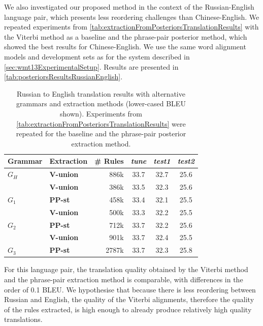 We also investigated our proposed method in the context of the Russian-English
language pair, which presents less reordering challenges than Chinese-English.
We repeated experiments from \autoref{tab:extractionFromPosteriorsTranslationResults}
with the Viterbi method as a baseline and the phrase-pair posterior method, which showed
the best results for Chinese-English. We use the same word alignment models and
development sets as for the system described in \autoref{sec:wmt13ExperimentalSetup}.
Results are presented in \autoref{tab:posteriorsResultsRussianEnglish}.
%
\begin{table}
  \begin{center}
    \begin{tabular}{|l|l|r|c|c|c|}
      \hline
      Grammar & Extraction & \# Rules & {\em tune} & {\em test1} & {\em test2} \\
      \hline
      $G_H$ & {\bf V-union} & 886k & 33.7 & 32.7 & 25.6  \\
      \hline
      & {\bf V-union} & 386k & 33.5 & 32.3 & 25.6 \\
      $G_1$ & {\bf PP-st} & 458k & 33.4 & 32.1 & 25.5 \\
      \hline
      & {\bf V-union} & 500k & 33.3 & 32.2 & 25.5 \\
      $G_2$& {\bf PP-st} & 712k & 33.7 & 32.2 & 25.6 \\
      \hline
      & {\bf V-union} & 901k & 33.7 & 32.4 & 25.5 \\
      $G_3$ & {\bf PP-st} & 2787k & 33.7 & 32.3 & 25.8 \\
      \hline
    \end{tabular}
    \caption{Russian to English translation results with alternative grammars and extraction methods (lower-cased BLEU shown). Experiments from \autoref{tab:extractionFromPosteriorsTranslationResults} were repeated for the baseline and the phrase-pair posterior extraction method. }
    \label{tab:posteriorsResultsRussianEnglish}
  \end{center}
\end{table}
%
For this language pair, the translation quality obtained by the Viterbi method and
the phrase-pair extraction method is comparable, with differences in the
order of 0.1 BLEU. We hypothesise that because there is less reordering between Russian and English, the
quality of the Viterbi alignments, therefore the quality of the rules extracted, is
high enough to already produce relatively high quality translations.

